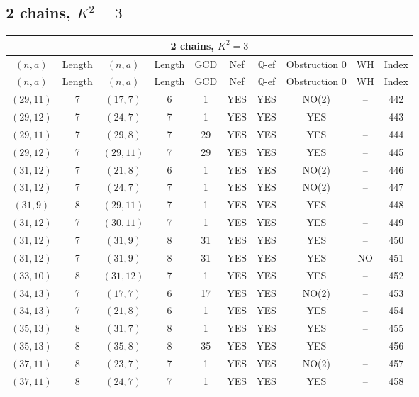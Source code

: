 \subsection{2 chains, $K^2 = 3$}
\begin{longtable}{|c|c|c|c|c|c|c|c|c|c|}
\hline
\multicolumn{10}{|c|}{2 chains, $K^2 = 3$}\\
\hline
$(n,a)$ & Length & $(n,a)$ & Length & GCD & Nef & $\mathbb Q$-ef & Obstruction 0 & WH & Index\\
\hline
\endfirsthead

\hline
$(n,a)$ & Length & $(n,a)$ & Length & GCD & Nef & $\mathbb Q$-ef & Obstruction 0 & WH & Index\\
\hline
\endhead
\hline
\endfoot

$(29, 11)$ & 7 & $(17, 7)$ & 6 & 1 & YES & YES & NO(2) & -- & 442\\
$(29, 12)$ & 7 & $(24, 7)$ & 7 & 1 & YES & YES & YES & -- & 443\\
$(29, 11)$ & 7 & $(29, 8)$ & 7 & 29 & YES & YES & YES & -- & 444\\
$(29, 12)$ & 7 & $(29, 11)$ & 7 & 29 & YES & YES & YES & -- & 445\\
$(31, 12)$ & 7 & $(21, 8)$ & 6 & 1 & YES & YES & NO(2) & -- & 446\\
$(31, 12)$ & 7 & $(24, 7)$ & 7 & 1 & YES & YES & NO(2) & -- & 447\\
$(31, 9)$ & 8 & $(29, 11)$ & 7 & 1 & YES & YES & YES & -- & 448\\
$(31, 12)$ & 7 & $(30, 11)$ & 7 & 1 & YES & YES & YES & -- & 449\\
$(31, 12)$ & 7 & $(31, 9)$ & 8 & 31 & YES & YES & YES & -- & 450\\
$(31, 12)$ & 7 & $(31, 9)$ & 8 & 31 & YES & YES & YES & NO & 451\\
$(33, 10)$ & 8 & $(31, 12)$ & 7 & 1 & YES & YES & YES & -- & 452\\
$(34, 13)$ & 7 & $(17, 7)$ & 6 & 17 & YES & YES & NO(2) & -- & 453\\
$(34, 13)$ & 7 & $(21, 8)$ & 6 & 1 & YES & YES & YES & -- & 454\\
$(35, 13)$ & 8 & $(31, 7)$ & 8 & 1 & YES & YES & YES & -- & 455\\
$(35, 13)$ & 8 & $(35, 8)$ & 8 & 35 & YES & YES & YES & -- & 456\\
$(37, 11)$ & 8 & $(23, 7)$ & 7 & 1 & YES & YES & NO(2) & -- & 457\\
$(37, 11)$ & 8 & $(24, 7)$ & 7 & 1 & YES & YES & YES & -- & 458\\

\end{longtable}
